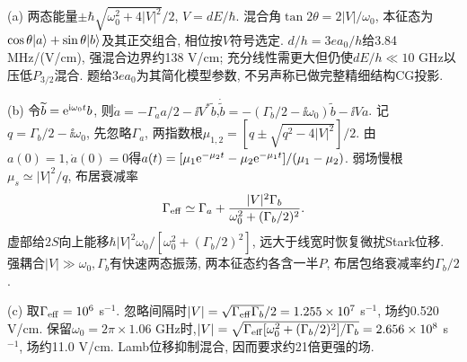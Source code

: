 \begin{solution}(a) 两态能量$\pm\hbar\sqrt{\omega_0^2+4|V|^2}/2$, $V=dE/\hbar$. 混合角$\tan2\theta=2|V|/\omega_0$, 本征态为$\cos\theta\lvert a\rangle+\sin\theta\lvert b\rangle$及其正交组合, 相位按$V$符号选定. $d/h=3ea_0/h$给3.84 MHz/(V/cm), 强混合边界约138 V/cm; 充分线性需更大但仍使$dE/h\ll10$ GHz以压低$P_{3/2}$混合. 题给$3ea_0$为其简化模型参数, 不另声称已做完整精细结构CG投影.

(b) 令$\widetilde b=\mathrm e^{\mathrm i\omega_0t}b$, 则$\dot a=-\Gamma_a a/2-\ii V^*\widetilde b$,$\dot{\widetilde b}=-(\Gamma_b/2-\ii\omega_0)\widetilde b-\ii Va$. 记$q=\Gamma_b/2-\ii\omega_0$, 先忽略$\Gamma_a$, 两指数根$\mu_{1,2}=[q\pm\sqrt{q^2-4|V|^2}]/2$. 由$a(0)=1,\dot a(0)=0$得$a(t)=[\mu_1\mathrm e^{-\mu_2t}-\mu_2\mathrm e^{-\mu_1t}]/(\mu_1-\mu_2)$. 弱场慢根$\mu_s\simeq|V|^2/q$, 布居衰减率
\[\Gamma_{\rm eff}\simeq\Gamma_a+\frac{|V|^2\Gamma_b}{\omega_0^2+(\Gamma_b/2)^2}.\]
虚部给$2S$向上能移$\hbar|V|^2\omega_0/[\omega_0^2+(\Gamma_b/2)^2]$, 远大于线宽时恢复微扰Stark位移. 强耦合$|V|\gg\omega_0,\Gamma_b$有快速两态振荡, 两本征态约各含一半$P$, 布居包络衰减率约$\Gamma_b/2$.

(c) 取$\Gamma_{\rm eff}=10^6$ s$^{-1}$. 忽略间隔时$|V|=\sqrt{\Gamma_{\rm eff}\Gamma_b}/2=1.255\times10^7$ s$^{-1}$, 场约0.520 V/cm. 保留$\omega_0=2\pi\times1.06$ GHz时,$|V|=\sqrt{\Gamma_{\rm eff}[\omega_0^2+(\Gamma_b/2)^2]/\Gamma_b}=2.656\times10^8$ s$^{-1}$, 场约11.0 V/cm. Lamb位移抑制混合, 因而要求约21倍更强的场.
\end{solution}

